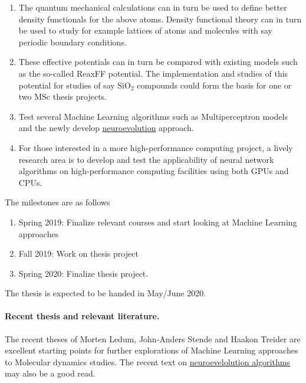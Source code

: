 \documentclass[%
oneside,                 %
final,                   %
10pt]{article}
\begin{document}
\begin{enumerate}
\item The quantum mechanical calculations can in turn be used to define better density functionals for the above atoms. Density functional theory can in turn be used to study for example lattices of atoms and molecules with say periodic boundary conditions.  

\item These effective potentials can in turn be compared with existing models such as the so-called ReaxFF potential. The implementation and studies of this potential for studies of say SiO$_2$ compounds could form the basis for one or two MSc thesis projects. 

\item Test several Machine Learning algorithms such as Multiperceptron models and the newly develop \href{{https://www.oreilly.com/ideas/neuroevolution-a-different-kind-of-deep-learning}}{neuroevolution} approach. 

\item For those interested in a more high-performance computing project, a lively research area is to develop and test the applicability of neural network algorithms on high-performance computing facilities using both GPUs and CPUs. 
\end{enumerate}

\noindent
The milestones are as follows
\begin{enumerate}
\item Spring 2019: Finalize relevant courses and start looking at Machine Learning approaches

\item Fall 2019: Work on thesis project

\item Spring 2020: Finalize thesis project.
\end{enumerate}

\noindent
The thesis is expected to be handed in May/June  2020.



\paragraph{Recent thesis and relevant literature.}
The recent theses of Morten Ledum, John-Anders Stende and Haakon Treider are excellent starting points for further explorations of Machine Learning approaches to Molecular dynamics studies. The recent text on \href{{https://www.oreilly.com/ideas/neuroevolution-a-different-kind-of-deep-learning}}{neuroevelolution algorithms}  may also be a good read.










\end{document}
